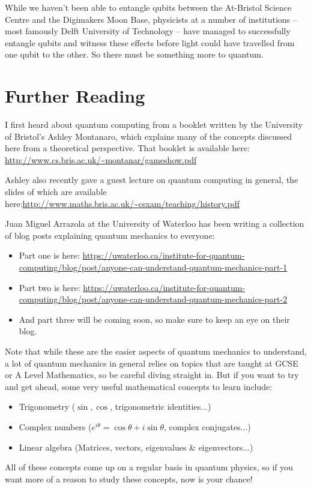 \documentclass[twocolumn]{article}
\begin{document}
While we haven't been able to entangle qubits between the At-Bristol Science Centre and the Digimakers Moon Base, physicists at a number of institutions -- most famously Delft University of Technology -- have managed to successfully entangle qubits and witness these effects before light could have travelled from one qubit to the other. So there must be something more to quantum.

\section{Further Reading}
\label{sec:further-reading}

I first heard about quantum computing from a booklet written by the University of Bristol's Ashley Montanaro, which explains many of the concepts discussed here from a theoretical perspective. That booklet is available here: \url{http://www.cs.bris.ac.uk/~montanar/gameshow.pdf}

Ashley also recently gave a guest lecture on quantum computing in general, the slides of which are available here:\url{http://www.maths.bris.ac.uk/~csxam/teaching/history.pdf}

Juan Miguel Arrazola at the University of Waterloo has been writing a collection of blog posts explaining quantum mechanics to everyone:

\begin{itemize}
\item Part one is here: \url{https://uwaterloo.ca/institute-for-quantum-computing/blog/post/anyone-can-understand-quantum-mechanics-part-1}
\item Part two is here: \url{https://uwaterloo.ca/institute-for-quantum-computing/blog/post/anyone-can-understand-quantum-mechanics-part-2}
\item And part three will be coming soon, so make sure to keep an eye on their blog.
\end{itemize}

Note that while these are the easier aspects of quantum mechanics to understand, a lot of quantum mechanics in general relies on topics that are taught at GCSE or A Level Mathematics, so be careful diving straight in. But if you want to try and get ahead, some very useful mathematical concepts to learn include:

\begin{itemize}
\item Trigonometry ($\sin, \cos$, trigonometric identities...)
\item Complex numbers ($e^{i\theta} = \cos\theta + i\sin\theta$, complex conjugates...)
\item Linear algebra (Matrices, vectors, eigenvalues \& eigenvectors...)
\end{itemize}

All of these concepts come up on a regular basis in quantum physics, so if you want more of a reason to study these concepts, now is your chance!
\end{document}
